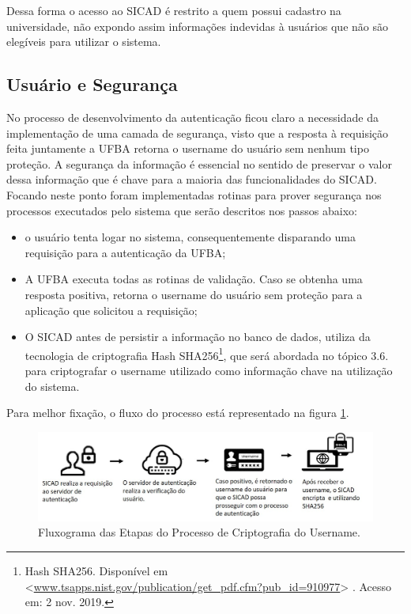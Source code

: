 \documentclass[12pt, a4paper]{report}
\begin{document}
Dessa forma o acesso ao \ac{SICAD} é restrito a quem possui cadastro na universidade, não expondo assim informações indevidas à usuários que não são elegíveis para utilizar o sistema.

\subsection{Usuário e Segurança}

No processo de desenvolvimento da autenticação ficou claro a necessidade da implementação de uma camada de segurança, visto que a resposta à requisição feita juntamente a \ac{UFBA} retorna o username do usuário sem nenhum tipo proteção.
A segurança da informação é essencial no sentido de preservar o valor dessa informação que é chave para a maioria das funcionalidades do \ac{SICAD}. Focando neste ponto foram implementadas rotinas para prover segurança nos processos executados pelo sistema que serão descritos nos passos abaixo:

\begin{itemize}
\item o usuário tenta logar no sistema, consequentemente disparando uma requisição para a autenticação da \ac{UFBA};
\item A \ac{UFBA} executa todas as rotinas de validação.
Caso se obtenha uma resposta positiva, retorna o username do usuário sem proteção para a aplicação que solicitou a requisição;
\item O \ac{SICAD} antes de persistir a informação no banco de dados, utiliza da tecnologia de criptografia Hash SHA256\footnote{Hash SHA256. Disponível em <\url{www.tsapps.nist.gov/publication/get_pdf.cfm?pub_id=910977}> . Acesso em: 2 nov. 2019.}, que será abordada no tópico 3.6. para criptografar o username utilizado como informação chave na utilização do sistema. 
\end{itemize}

Para melhor fixação, o fluxo do processo está representado na figura \ref{fig:fluxograma_criptografia}. 

\begin{figure}
\centering
\includegraphics[scale=0.80]{fluxograma_criptografia.jpg}
\caption{Fluxograma das Etapas do Processo de Criptografia do Username.}
\label{fig:fluxograma_criptografia}
\end{figure}
\end{document}

